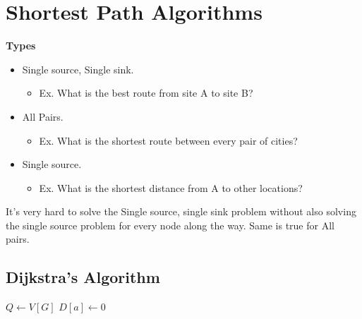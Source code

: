 \documentclass[english, 10pt]{article}
\begin{document}
\section{Shortest Path Algorithms}
\textbf{Types}
\begin{itemize}
    \item Single source, Single sink.
        \begin{itemize}
        \item Ex. What is the best route from site A to site B? 
        \end{itemize}
    \item All Pairs.
        \begin{itemize}
        \item Ex. What is the shortest route between every pair of cities? 
        \end{itemize}
    \item Single source.
        \begin{itemize}
        \item Ex. What is the shortest distance from A to other locations? 
        \end{itemize}
\end{itemize}

It's very hard to solve the Single source, single sink problem without also
solving the single source problem for every node along the way. Same is true
for All pairs.

\subsection{Dijkstra's Algorithm}

\begin{algorithm}[H]
    $Q \gets V[G]$ 
    $D[a] \gets 0$\;
\end{algorithm}
\end{document}
